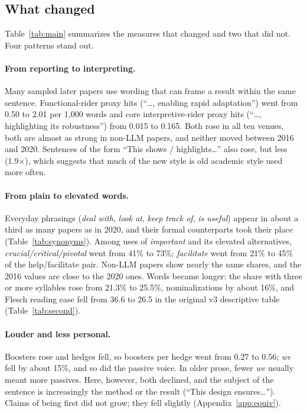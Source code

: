 \documentclass[10pt,twocolumn]{article}
\begin{document}
\subsection{What changed}

Table~\ref{tab:main} summarizes the measures that changed and two that did not. Four patterns stand out.

\paragraph{From reporting to interpreting.} Many sampled later papers use wording that can frame a result within the same sentence. Functional-rider proxy hits (``\ldots, enabling rapid adaptation'') went from 0.50 to 2.01 per 1,000 words and core interpretive-rider proxy hits (``\ldots, highlighting its robustness'') from 0.015 to 0.165. Both rose in all ten venues, both are almost as strong in non-LLM papers, and neither moved between 2016 and 2020. Sentences of the form ``This shows / highlights\ldots'' also rose, but less (1.9$\times$), which suggests that much of the new style is old academic style used more often.

\paragraph{From plain to elevated words.} Everyday phrasings (\textit{deal with}, \textit{look at}, \textit{keep track of}, \textit{is useful}) appear in about a third as many papers as in 2020, and their formal counterparts took their place (Table~\ref{tab:synonyms}). Among uses of \textit{important} and its elevated alternatives, \textit{crucial/critical/pivotal} went from 41\% to 73\%; \textit{facilitate} went from 21\% to 45\% of the help/facilitate pair. Non-LLM papers show nearly the same shares, and the 2016 values are close to the 2020 ones. Words became longer: the share with three or more syllables rose from 21.3\% to 25.5\%, nominalizations by about 16\%, and Flesch reading ease fell from 36.6 to 26.5 in the original v3 descriptive table (Table~\ref{tab:second}).

\paragraph{Louder and less personal.} Boosters rose and hedges fell, so boosters per hedge went from 0.27 to 0.56; \textit{we} fell by about 15\%, and so did the passive voice. In older prose, fewer \textit{we} usually meant more passives. Here, however, both declined, and the subject of the sentence is increasingly the method or the result (``This design ensures\ldots''). Claims of being first did not grow; they fell slightly (Appendix~\ref{app:equiv}).
\end{document}
